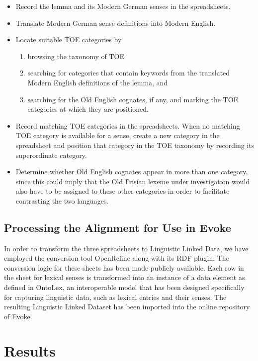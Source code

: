 \begin{itemize}
    \item Record the lemma and its Modern German senses in the spreadsheets.
    \item Translate Modern German sense definitions into Modern English.
    \item Locate suitable TOE categories by
    \begin{enumerate}[label=(\alph*)]
        \item browsing the taxonomy of TOE
        \item searching for categories that contain keywords from the translated Modern English definitions of the lemma, and
        \item searching for the Old English cognates, if any, and marking the TOE categories at which they are positioned. 
    \end{enumerate}
    \item Record matching TOE categories in the spreadsheets. When no matching TOE category is available for a sense, create a new category in the spreadsheet and position that category in the TOE taxonomy by recording its superordinate category.
    \item Determine whether Old English cognates appear in more than one category, since this could imply that the Old Frisian lexeme under investigation would also have to be assigned to these other categories in order to facilitate contrasting the two languages. 
\end{itemize}


\subsection{Processing the Alignment for Use in Evoke}
In order to transform the three spreadsheets to Linguistic Linked Data, we have employed the conversion tool OpenRefine along with its RDF plugin. The conversion logic for these sheets has been made publicly available.  Each row in the sheet for lexical senses is transformed into an instance of a data element as defined in OntoLex, an interoperable model that has been designed specifically for capturing linguistic data, such as lexical entries and their senses.  The resulting Linguistic Linked Dataset has been imported into the online repository of Evoke.

\section{Results}
\label{sect:Stolk2021b:Results}


